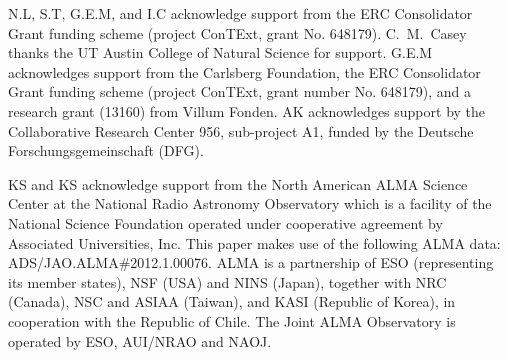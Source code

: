 \documentclass[a4paper,fleqn,usenatbib]{mnras}
\begin{document}
N.L, S.T, G.E.M, and I.C acknowledge  support from the ERC Consolidator Grant funding scheme (project ConTExt, grant No. 648179). C.\ M.\ Casey thanks the UT Austin College of Natural Science for support. G.E.M acknowledges support from the Carlsberg Foundation, the ERC Consolidator Grant funding scheme (project ConTExt, grant number No. 648179), and a research grant (13160) from Villum Fonden. AK acknowledges support by the Collaborative Research Center 956, sub-project A1, funded by the Deutsche Forschungsgemeinschaft (DFG).

KS and KS acknowledge support from the North American ALMA Science Center at the National Radio Astronomy Observatory which is a facility of the National Science Foundation operated under cooperative agreement by Associated Universities, Inc. This paper makes use of the following ALMA data: ADS/JAO.ALMA\#2012.1.00076. ALMA is a partnership of ESO (representing its member states), NSF (USA) and NINS (Japan), together with NRC (Canada), NSC and ASIAA (Taiwan), and KASI (Republic of Korea), in cooperation with the Republic of Chile. The Joint ALMA Observatory is operated by ESO, AUI/NRAO and NAOJ.











\end{document}

